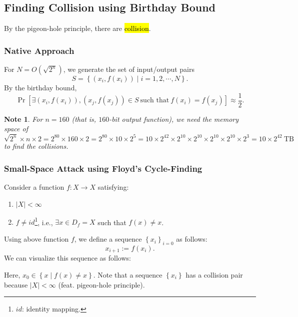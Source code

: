 \documentclass[12pt,openany]{book}
\newtheorem*{note}{Note}
\newcommand{\set}[1]{\left\{#1\right\}}
\newcommand{\ie}{\textnormal{i.e.}}
\newcommand{\abs}[1]{\left\lvert #1 \right\rvert}
\begin{document}
	\newpage
	\subsection{Finding Collision using Birthday Bound}
	By the pigeon-hole principle, there are \hl{collision}.
	\subsubsection{Native Approach}
	For $N=O(\sqrt{2^n})$, we generate the set of input/output pairs \[
	S=\set{(x_i,f(x_i))\mid i=1,2,\cdots, N}.
	\] By the birthday bound, \[
	\Pr[\exists(x_i,f(x_i)),(x_j,f(x_j))\in S\ \text{such that}\ f(x_i)=f(x_j)]\approx\frac{1}{2}.
	\]\begin{note}
		For $n=160$ (that is, $160$-bit output function), we need the memory space of \[
		\sqrt{2^n}\times n\times2=2^{80}\times160\times2=2^{80}\times10\times 2^5=10\times2^{42}\times2^{10}\times2^{10}\times2^{10}\times2^{10}\times2^3=10\times 2^{42}\ \text{TB}
		\] to find the collisions.
	\end{note}
	
	\subsubsection{Small-Space Attack using Floyd's Cycle-Finding}
	Consider a function $f:X\to X$ satisfying: \begin{enumerate}
		\item $\abs{X}<\infty$
		\item $f\neq id$\footnote{$id$: identity mapping.}, \ie, $\exists x\in D_f=X$ such that $f(x)\neq x$.
	\end{enumerate} Using above function $f$, we define a sequence $\set{x_i}_{i=0}$ as follows: \[
	x_{i+1}:=f(x_i).
	\] We can visualize this sequence as follows: \begin{center}
	\end{center} Here, $x_0\in\set{x\mid f(x)\neq x}$. Note that a sequence $\set{x_i}$ has a collision pair because $\abs{X}<\infty$ (feat. pigeon-hole principle).
	
\end{document}
